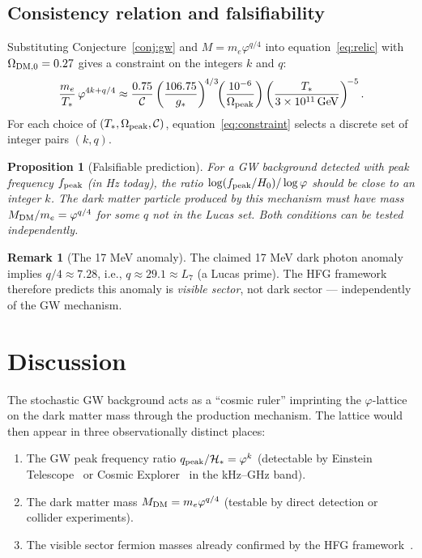 \documentclass[12pt]{article}
\newtheorem{proposition}[conjecture]{Proposition}
\theoremstyle{definition}
\newtheorem{remark}[conjecture]{Remark}
\newcommand{\ph}{\varphi}
\newcommand{\Hstar}{\mathcal{H}_*}
\begin{document}
\subsection{Consistency relation and falsifiability}

Substituting Conjecture~\ref{conj:gw} and $M=m_e\ph^{q/4}$ into
equation~\eqref{eq:relic} with $\Omega_{\rm DM,0}=0.27$ gives a
constraint on the integers $k$ and $q$:
\begin{equation}
  \frac{m_e}{T_*}\,\ph^{4k + q/4} \approx
  \frac{0.75}{\mathcal{C}}
  \left(\frac{106.75}{g_*}\right)^{\!4/3}
  \!\!\left(\frac{10^{-6}}{\Omega_{\rm peak}}\right)
  \left(\frac{T_*}{3\times10^{11}\,{\rm GeV}}\right)^{\!-5}.
  \label{eq:constraint}
\end{equation}
For each choice of $(T_*, \Omega_{\rm peak}, \mathcal{C})$,
equation~\eqref{eq:constraint} selects a discrete set of
integer pairs $(k,q)$.

\begin{proposition}[Falsifiable prediction]
For a GW background detected with peak frequency $f_{\rm peak}$
(in Hz today), the ratio $\log(f_{\rm peak}/H_0)/\log\ph$ should be
close to an integer $k$. The dark matter particle produced by this
mechanism must have mass $M_{\rm DM}/m_e = \ph^{q/4}$ for some $q$
not in the Lucas set. Both conditions can be tested independently.
\end{proposition}

\begin{remark}[The 17 MeV anomaly]
The claimed 17 MeV dark photon anomaly implies $q/4 \approx 7.28$,
i.e., $q \approx 29.1 \approx L_7$ (a Lucas prime). The HFG
framework therefore predicts this anomaly is \emph{visible sector},
not dark sector — independently of the GW mechanism.
\end{remark}

\section{Discussion}

The stochastic GW background acts as a ``cosmic ruler'' imprinting
the $\ph$-lattice on the dark matter mass through the production
mechanism. The lattice would then appear in three observationally
distinct places:
\begin{enumerate}
  \item The GW peak frequency ratio $q_{\rm peak}/\Hstar = \ph^k$
        (detectable by Einstein Telescope~\cite{ET} or
        Cosmic Explorer~\cite{CE} in the kHz--GHz band).
  \item The dark matter mass $M_{\rm DM} = m_e\ph^{q/4}$
        (testable by direct detection or collider experiments).
  \item The visible sector fermion masses already confirmed by the
        HFG framework~\cite{Gentry:Lucas}.
\end{enumerate}
\end{document}
